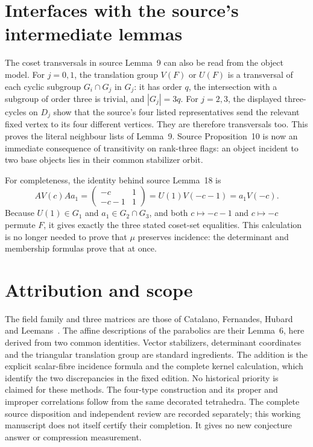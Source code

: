 \documentclass[11pt,a4paper]{article}
\begin{document}
\section{Interfaces with the source's intermediate lemmas}

The coset transversals in source Lemma~9 can also be read from
the object model. For $j=0,1$, the translation group $V(F)$ or
$U(F)$ is a transversal of each cyclic subgroup
$G_i\cap G_j$ in $G_j$: it has order $q$, the intersection
with a subgroup of order three is trivial, and $|G_j|=3q$.
For $j=2,3$, the displayed three-cycles on $D_j$ show that the
source's four listed representatives send the relevant fixed
vertex to its four different vertices. They are therefore
transversals too. This proves the literal neighbour lists of
Lemma~9. Source Proposition~10 is now an immediate consequence
of transitivity on rank-three flags: an object incident to two
base objects lies in their common stabilizer orbit.

For completeness, the identity behind source Lemma~18 is
\[
 A V(c) A a_1
   =\begin{pmatrix}-c&1\\-c-1&1\end{pmatrix}
   =U(1)V(-c-1)=a_1V(-c).
\]
Because $U(1)\in G_1$ and $a_1\in G_2\cap G_3$, and both
$c\mapsto-c-1$ and $c\mapsto-c$ permute $F$, it gives
exactly the three stated coset-set equalities. This calculation
is no longer needed to prove that $\mu$ preserves incidence:
the determinant and membership formulas prove that at once.

\section{Attribution and scope}

The field family and three matrices are those of Catalano,
Fernandes, Hubard and Leemans~\cite{source}. The affine descriptions
of the parabolics are their Lemma~6, here derived from two common
identities. Vector stabilizers, determinant coordinates and the
triangular translation group are standard ingredients. The addition
is the explicit scalar-fibre incidence formula and the complete
kernel calculation, which identify the two discrepancies in the
fixed edition. No historical priority is claimed for these methods.
The four-type construction and its proper and improper correlations
follow from the same decorated tetrahedra. The complete source
disposition and independent review are recorded separately; this
working manuscript does not itself certify their completion.
It gives no new conjecture answer or compression measurement.
\end{document}
